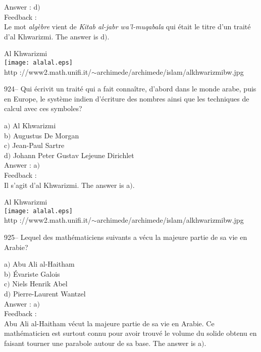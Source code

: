 \documentclass[letterpaper, 12pt]{article}
\begin{document}
Answer : d$)$\\

Feedback : \\
Le mot {\sl alg\`ebre} vient de {\sl Kitab al-jabr wa'l-muqabala} qui
\'etait le titre d'un trait\'e d'al Khwarizmi. The answer is d$)$.\\

        \begin{center}
        Al Khwarizmi\\
    \texttt{[image: alalal.eps]}\\
        {\footnotesize http
://www2.math.unifi.it/$\sim$archimede/archimede/islam/alkhwarizmibw.jpg}
    \end{center}

924-- Qui \'ecrivit un trait\'e qui a fait conna\^itre, d'abord dans
le monde arabe, puis en Europe, le syst\`eme indien d'\'ecriture des
nombres ainsi que les techniques de calcul avec ces symboles?

a$)$ Al Khwarizmi \\
b$)$ Augustus De Morgan \\
c$)$ Jean-Paul Sartre \\
d$)$ Johann Peter Gustav Lejeune Dirichlet\\

Answer : a$)$\\

Feedback :\\
Il s'agit d'al Khwarizmi. The answer is a$)$.\\

        \begin{center}
        Al Khwarizmi\\
    \texttt{[image: alalal.eps]}\\
        {\footnotesize http
://www2.math.unifi.it/$\sim$archimede/archimede/islam/alkhwarizmibw.jpg}
    \end{center}

925-- Lequel des math\'ematiciens suivants a v\'ecu la majeure
partie de sa vie en Arabie?

a$)$ Abu Ali al-Haitham \\
b$)$ \'Evariste Galois \\
c$)$ Niels Henrik Abel \\
d$)$ Pierre-Laurent Wantzel \\

Answer : a$)$\\

Feedback : \\
Abu Ali al-Haitham v\'ecut la majeure partie de sa vie en Arabie. Ce
math\'ematicien est surtout connu pour avoir trouv\'e le volume du
solide obtenu en faisant tourner une parabole
autour de sa base. The answer is a$)$.\\
\end{document}
